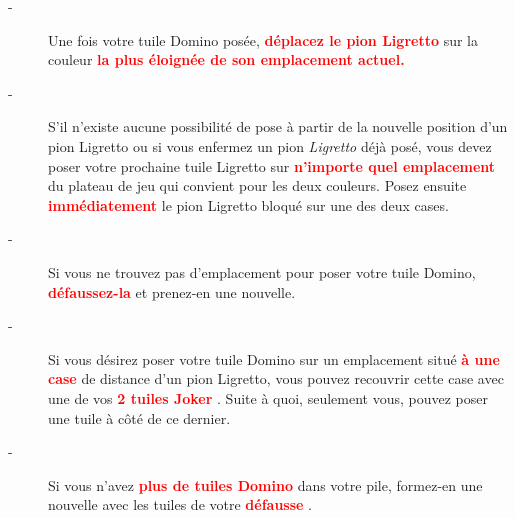 \documentclass{article}%
\begin{document}
\begin{description}%
\item[{-} ]%
%
 Une fois votre tuile Domino posée, %
\textcolor{red}{%
\textbf{déplacez le pion Ligretto}%
}%
\textit{ }%
 sur la couleur %
\textcolor{red}{%
\textbf{la plus éloignée de son emplacement actuel.
}%
}%
\item[{-} ]%
%
 S'il n'existe aucune possibilité de pose à partir de la nouvelle position d'un pion Ligretto ou si vous enfermez un pion %
\textit{Ligretto}%
\textit{ }%
 déjà posé, vous devez poser votre prochaine tuile Ligretto sur %
\textcolor{red}{%
\textbf{n’importe quel emplacement}%
}%
\textit{ }%
 du plateau de jeu qui convient pour les deux couleurs. Posez ensuite %
\textcolor{red}{%
\textbf{immédiatement}%
}%
\textit{ }%
 le pion Ligretto bloqué sur une des deux cases.
%
\item[{-} ]%
%
 Si vous ne trouvez pas d'emplacement pour poser votre tuile Domino, %
\textcolor{red}{%
\textbf{défaussez{-}la}%
}%
\textit{ }%
 et prenez{-}en une nouvelle.
%
\item[{-} ]%
%
 Si vous désirez poser votre tuile Domino sur un emplacement situé %
\textcolor{red}{%
\textbf{à une case}%
}%
\textit{ }%
 de distance d'un pion Ligretto, vous pouvez recouvrir cette case avec une de vos %
\textcolor{red}{%
\textbf{2 tuiles Joker}%
}%
. Suite à quoi, seulement vous, pouvez poser une tuile à côté de ce dernier.
%
\item[{-} ]%
%
 Si vous n'avez %
\textcolor{red}{%
\textbf{plus de tuiles Domino}%
}%
\textit{ }%
 dans votre pile, formez{-}en une nouvelle avec les tuiles de votre %
\textcolor{red}{%
\textbf{défausse}%
}%
.
%
\end{description}

%
\end{document}

